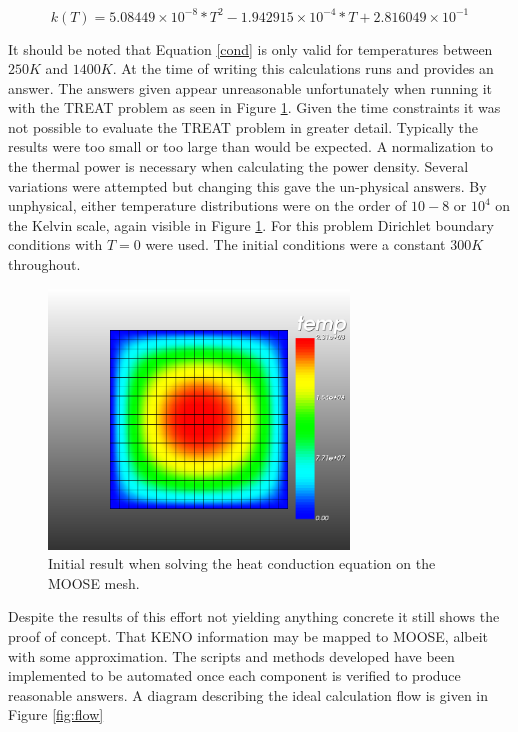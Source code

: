 \documentclass[11pt]{article}
\begin{document}
\begin{equation}
    k(T) = 5.08449 \times 10^{-8} * T^2 - 1.942915 \times 10^{-4} * T + 2.816049 \times 10^{-1}
    \label{cond}
\end{equation}

It should be noted that Equation \ref{cond} is only valid for temperatures between $250K$ and $1400K$.
At the time of writing this calculations runs and provides an answer.  The answers given appear unreasonable unfortunately when running it with the TREAT problem as seen in Figure \ref{fig:moose-mesh}.  Given the time constraints it was not possible to evaluate the TREAT problem in greater detail.  Typically the results were too small or too large than would be expected.  A normalization to the thermal power is necessary when calculating the power density.  Several variations were attempted but changing this gave the un-physical answers.  By unphysical, either temperature distributions were on the order of $10-8$ or $10^4$ on the Kelvin scale, again visible in Figure \ref{fig:moose-mesh}.  For this problem Dirichlet boundary conditions with $T=0$ were used.  The initial conditions were a constant $300K$ throughout.  

\begin{figure}[h]
    \centering
    \includegraphics[width=8cm]{figures/large-with-mesh-temp.png}
    \caption{Initial result when solving the heat conduction equation on the MOOSE mesh.}
    \label{fig:moose-mesh}
\end{figure}

Despite the results of this effort not yielding anything concrete it still shows the proof of concept.  That KENO information may be mapped to MOOSE, albeit with some approximation.  The scripts and methods developed have been implemented to be automated once each component is verified to produce reasonable answers.  A diagram describing the ideal calculation flow is given in Figure \ref{fig:flow}
\end{document}
